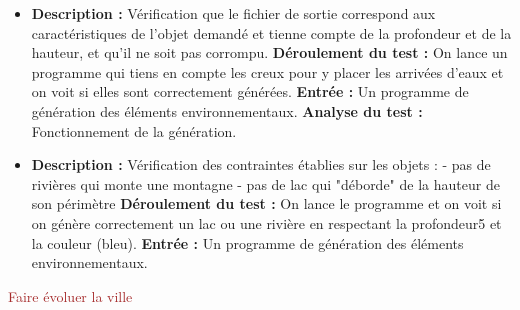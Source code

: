 {
\begin{itemize}

\item \textbf{\tab Description : } Vérification que le fichier de sortie correspond aux caractéristiques de l'objet demandé et tienne compte de la profondeur et de la hauteur, et qu'il ne soit pas corrompu. \newline
\textbf{\tab Déroulement du test : } On lance un programme qui tiens en compte les creux pour y placer les arrivées d'eaux et on voit si elles sont correctement générées. \newline
\textbf{\tab Entrée : } Un programme de génération des éléments environnementaux. \newline
\textbf{\tab Analyse du test : } Fonctionnement de la génération.

\item \textbf{\tab Description : } Vérification des contraintes établies sur les objets : 
    - pas de rivières qui monte une montagne
	- pas de lac qui "déborde" de la hauteur de son périmètre\newline
\textbf{\tab Déroulement du test : } On lance le programme et on voit si on génère correctement un lac ou une rivière en respectant la profondeur5 et la couleur (bleu). \newline
\textbf{\tab Entrée : } Un programme de génération des éléments environnementaux.
\end{itemize}
}
\besoin{}
{\textcolor{brown}{Faire évoluer la ville}}
